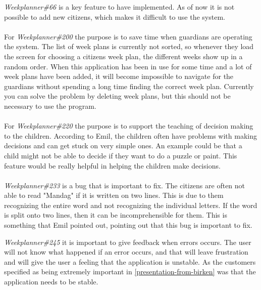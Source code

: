 \noindent
\textit{Weekplanner\#66} is a key feature to have implemented. 
As of now it is not possible to add new citizens, which makes it difficult to use the system. 
\\\\
For \textit{Weekplanner\#200} the purpose is to save time when guardians are operating the system. 
The list of week plans is currently not sorted, so whenever they load the screen for choosing a citizens week plan, the different weeks show up in a random order. 
When this application has been in use for some time and a lot of week plans have been added, it will become impossible to navigate for the guardians without spending a long time finding the correct week plan.
Currently you can solve the problem by deleting week plans, but this should not be necessary to use the program.
\\\\
For \textit{Weekplanner\#220} the purpose is to support the teaching of decision making to the children.
According to Emil, the children often have problems with making decisions and can get stuck on very simple ones. 
An example could be that a child might not be able to decide if they want to do a puzzle or paint.
This feature would be really helpful in helping the children make decisions.
\\\\
\textit{Weekplanner\#233} is a bug that is important to fix.
The citizens are often not able to read "Mandag" if it is written on two lines. 
This is due to them recognizing the entire word and not recognizing the individual letters. 
If the word is split onto two lines, then it can be incomprehensible for them.
This is something that Emil pointed out, pointing out that this bug is important to fix.

\textit{Weekplanner\#245} it is important to give feedback when errors occurs. 
The user will not know what happened if an error occurs, and that will leave frustration and will give the user a feeling that the application is unstable.
As the customers specified as being extremely important in \autoref{presentation-from-birken} was that the application needs to be stable.

